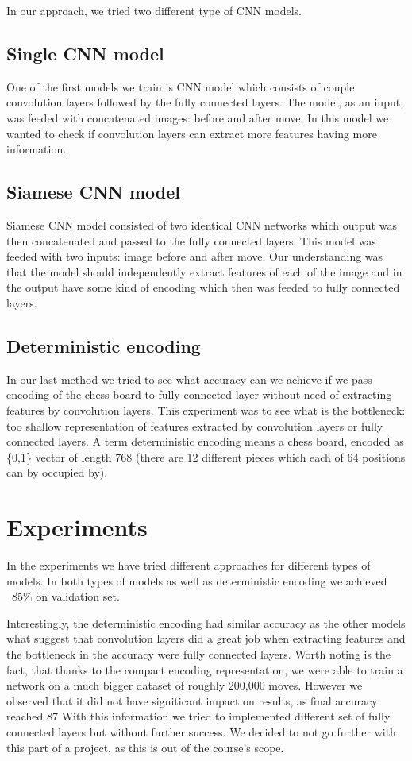\documentclass[10pt,twocolumn,letterpaper]{article}
\begin{document}
In our approach, we tried two different type of CNN models.

\subsection{Single CNN model}

One of the first models we train is CNN model which consists of couple convolution
layers followed by the fully connected layers. The model, as an input, was feeded
with concatenated images: before and after move. In this model we wanted to check
if convolution layers can extract more features having more information.

\subsection{Siamese CNN model}

Siamese CNN model consisted of two identical CNN networks which output was then
concatenated and passed to the fully connected layers. This model was feeded
with two inputs: image before and after move. Our understanding was that the
model should independently extract features of each of the image and in the
output have some kind of encoding which then was feeded to fully connected
layers.

\subsection{Deterministic encoding}

In our last method we tried to see what accuracy can we achieve if we pass
encoding of the chess board to fully connected layer without need of extracting
features by convolution layers. This experiment was to see what is the bottleneck:
too shallow representation of features extracted by convolution layers or fully
connected layers. A term deterministic encoding means a chess board, encoded as
\{0,1\} vector of length 768 (there are 12 different pieces which each of 
64 positions can by occupied by).

\section{Experiments}

In the experiments we have tried different approaches for different types of
models. In both types of models as well as deterministic encoding we achieved
~85\% on validation set.

Interestingly, the deterministic encoding had similar accuracy as the other models
what suggest that convolution layers did a great job when extracting features
and the bottleneck in the accuracy were fully connected layers. Worth noting is the fact, 
that thanks to the compact encoding representation, we were able to train a network on a 
much bigger dataset of roughly 200,000 moves.
However we observed that it did not have signiticant impact on results, as final
accuracy reached 87%
With this information we tried to implemented different set of fully 
connected layers but without further success. We decided to not go further with this 
part of a project, as this is out of the course's scope.
\end{document}
